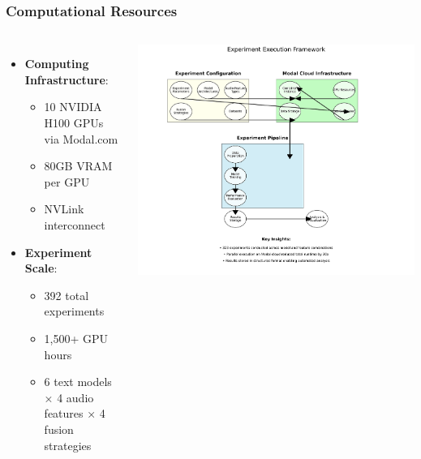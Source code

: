 \documentclass{beamer}
\begin{document}
\begin{frame}
\frametitle{Computational Resources}
\begin{columns}
\begin{itemize}
    \item \textbf{Computing Infrastructure}:
    \begin{itemize}
        \item \alert{10 NVIDIA H100 GPUs} via Modal.com
        \item 80GB VRAM per GPU
        \item NVLink interconnect
    \end{itemize}
    \item \textbf{Experiment Scale}:
    \begin{itemize}
        \item \alert{392 total experiments}
        \item 1,500+ GPU hours
        \item 6 text models × 4 audio features × 4 fusion strategies
    \end{itemize}
\end{itemize}

\includegraphics[width=\textwidth]{figures/experiment_framework.png}
\end{columns}
\end{frame}
\end{document}
